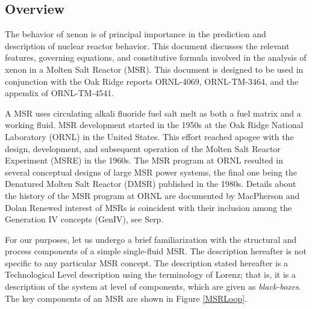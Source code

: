 \subsection{Overview}
The behavior of xenon is of principal importance in the prediction and description of nuclear reactor behavior.  This document discusses the relevant features, governing equations, and constitutive formula involved in the analysis of xenon in a Molten Salt Reactor (MSR).  This document is designed to be used in conjunction with the Oak Ridge reports ORNL-4069, ORNL-TM-3464, and the appendix of ORNL-TM-4541. \cite{ORNL4069} \cite{ORNLTM3464} \cite[p. 170]{Robertson1971}

A MSR uses circulating alkali fluoride fuel salt melt as both a fuel matrix and a working fluid. MSR development started in the 1950s at the Oak Ridge National Laboratory (ORNL) in the United States.  This effort reached apogee with the design, development, and subsequent operation of the Molten Salt Reactor Experiment (MSRE) in the 1960s.  The MSR program at ORNL resulted in several conceptual designs of large MSR power systems,  the final one being the Denatured Molten Salt Reactor (DMSR) published in the 1980s.  Details about the history of the MSR program at ORNL are documented by MacPherson and Dolan \cite{MacPherson1985} \cite[p. 2]{Dolan2017} Renewed interest of MSRs is coincident with their inclusion among the Generation IV concepts (GenIV), see Serp. \cite{Serp2014}

For our purposes, let us undergo a brief familiarization with the structural and process components of a simple single-fluid MSR. The description hereafter is not specific to any particular MSR concept. The description stated hereafter is a Technological Level description using the terminology of Lorenz; that is, it is a description of the system at level of components, which are given as \textit{black-boxes}.\cite{Lorenz1996}
The key components of an MSR are shown in Figure \ref{MSRLoop}.


